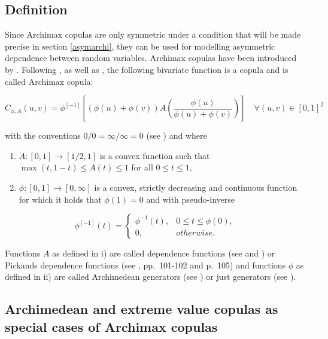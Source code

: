 \documentclass[
]{krantz}
\begin{document}
\subsection{Definition}\label{definition}

Since Archimax copulas are only symmetric under a condition that will be made precise in section \ref{asymarchi}, they can be used for modelling asymmetric dependence between random variables. Archimax copulas have been introduced by \citet{caperaa2000}. Following \citet{caperaa2000}, \citet{bacigal2011} as well as \citet{durante2010b}, the following bivariate function is a copula and is called Archimax copula:

\begin{equation}
C_{\phi, A}(u, v) = \phi^{[-1]} \left[ (\phi(u) + \phi(v)) A \left( \frac{\phi(u)}{\phi(u) + \phi(v)} \right) \right] \quad \forall (u,v) \in [0,1]^2
\label{eq:archimax}
\end{equation}

with the conventions \(0/0 = \infty/\infty=0\) (see \citet{bacigal2011}) and where

\begin{enumerate}
\def\labelenumi{\roman{enumi})}
\item
  \(A: [0, 1] \rightarrow [1/2, 1]\) is a convex function such that \(\max(t, 1 - t) \leq A(t) \leq 1\) for all \(0 \leq t \leq 1\),
\item
  \(\phi: [0, 1] \rightarrow [0, \infty]\) is a convex, strictly decreasing and continuous function for which it holds that \(\phi(1) = 0\) and with pseudo-inverse
\end{enumerate}

\begin{equation}
\phi^{[-1]}(t) = 
\begin{cases} 
\phi^{-1}(t), & 0 \leq t \leq \phi(0), 
\\0, & otherwise.
\label{eq:pseudoinv}
\end{cases}
\end{equation}

Functions \(A\) as defined in i) are called dependence functions (see \citet{caperaa2000} and \citet{bacigal2011}) or Pickands dependence functions (see \citet{genest2013}, pp.~101-102 and p.~105) and functions \(\phi\) as defined in ii) are called Archimedean generators (see \citet{caperaa2000}) or just generators (see \citet{bacigal2011}).

\subsection{Archimedean and extreme value copulas as special cases of Archimax copulas}\label{special}
\end{document}
